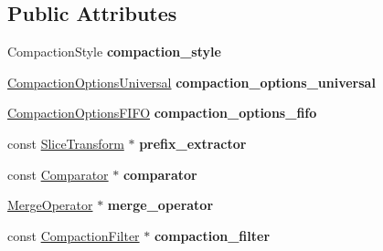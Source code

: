 \subsection*{Public Attributes}
\begin{DoxyCompactItemize}
\item 
Compaction\+Style {\bfseries compaction\+\_\+style}\hypertarget{structrocksdb_1_1ImmutableCFOptions_a4776a2aa3bc768ce4ac7e3c076325a29}{}\label{structrocksdb_1_1ImmutableCFOptions_a4776a2aa3bc768ce4ac7e3c076325a29}

\item 
\hyperlink{classrocksdb_1_1CompactionOptionsUniversal}{Compaction\+Options\+Universal} {\bfseries compaction\+\_\+options\+\_\+universal}\hypertarget{structrocksdb_1_1ImmutableCFOptions_a3229407b8be2877528a8ea03c44aa3ac}{}\label{structrocksdb_1_1ImmutableCFOptions_a3229407b8be2877528a8ea03c44aa3ac}

\item 
\hyperlink{structrocksdb_1_1CompactionOptionsFIFO}{Compaction\+Options\+F\+I\+FO} {\bfseries compaction\+\_\+options\+\_\+fifo}\hypertarget{structrocksdb_1_1ImmutableCFOptions_ac543f1366457188cf1e8f5246c746acc}{}\label{structrocksdb_1_1ImmutableCFOptions_ac543f1366457188cf1e8f5246c746acc}

\item 
const \hyperlink{classrocksdb_1_1SliceTransform}{Slice\+Transform} $\ast$ {\bfseries prefix\+\_\+extractor}\hypertarget{structrocksdb_1_1ImmutableCFOptions_ad9314688866ffd1187d838a2438cafcb}{}\label{structrocksdb_1_1ImmutableCFOptions_ad9314688866ffd1187d838a2438cafcb}

\item 
const \hyperlink{classrocksdb_1_1Comparator}{Comparator} $\ast$ {\bfseries comparator}\hypertarget{structrocksdb_1_1ImmutableCFOptions_a07d56ede7bc4454b72ad8435c4e5dc62}{}\label{structrocksdb_1_1ImmutableCFOptions_a07d56ede7bc4454b72ad8435c4e5dc62}

\item 
\hyperlink{classrocksdb_1_1MergeOperator}{Merge\+Operator} $\ast$ {\bfseries merge\+\_\+operator}\hypertarget{structrocksdb_1_1ImmutableCFOptions_a42ac2d42e68913dd68edd0bd88dbef98}{}\label{structrocksdb_1_1ImmutableCFOptions_a42ac2d42e68913dd68edd0bd88dbef98}

\item 
const \hyperlink{classrocksdb_1_1CompactionFilter}{Compaction\+Filter} $\ast$ {\bfseries compaction\+\_\+filter}\hypertarget{structrocksdb_1_1ImmutableCFOptions_a943ce36274c18ea47c3b313a45f28457}{}\label{structrocksdb_1_1ImmutableCFOptions_a943ce36274c18ea47c3b313a45f28457}


\end{DoxyCompactItemize}
